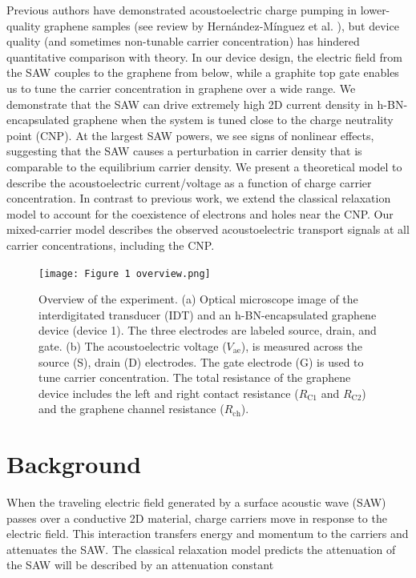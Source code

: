 \documentclass{beavtex_dub_edit}
\begin{document}
Previous authors have demonstrated acoustoelectric charge pumping in lower-quality graphene samples (see review by Hernández-Mínguez et al. \cite{hernandez-minguez_interaction_2018}), but device quality (and sometimes non-tunable carrier concentration) has hindered quantitative comparison with theory. In our device design, the electric field from the SAW couples to the graphene from below, while a graphite top gate enables us to tune the carrier concentration in graphene over a wide range. We demonstrate that the SAW can drive extremely high 2D current density in h-BN-encapsulated graphene when the system is tuned close to the charge neutrality point (CNP). At the largest SAW powers, we see signs of nonlinear effects, suggesting that the SAW causes a perturbation in carrier density that is comparable to the equilibrium carrier density.  We present a theoretical model to describe the acoustoelectric current/voltage as a function of charge carrier concentration. In contrast to previous work, we extend the classical relaxation model to account for the coexistence of electrons and holes near the CNP. Our mixed-carrier model describes the observed acoustoelectric transport signals at all carrier concentrations, including the CNP.

\begin{figure}
    \texttt{[image: Figure 1 overview.png]}
    \caption{Overview of the experiment. (a) Optical microscope image of the interdigitated transducer (IDT) and an h-BN-encapsulated graphene device (device 1). The three electrodes are labeled source, drain, and gate. (b) The acoustoelectric voltage ($V_{\mathrm{ae}}$), is measured across the source (S), drain (D) electrodes. The gate electrode (G) is used to tune carrier concentration. The total resistance of the graphene device includes the left and right contact resistance ($R_{\mathrm{C1}}$  and $R_{\mathrm{C2}}$) and the graphene channel resistance ($R_{\mathrm{ch}}$).}
    \label{AECP Figure 1}
\end{figure}
\section{Background}

When the traveling electric field generated by a surface acoustic wave (SAW) passes over a conductive 2D material, charge carriers move in response to the electric field. This interaction transfers energy and momentum to the carriers and attenuates the SAW. The classical relaxation model predicts the attenuation of the SAW will be described by an attenuation constant \cite{wixforth_surface_1989}
\end{document}
